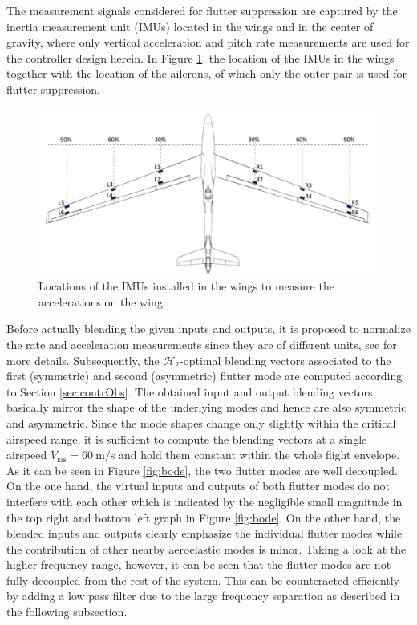 \documentclass[aerospace,article,submit,moreauthors,pdftex,10pt,a4paper]{Definitions/mdpi}
\begin{document}
The measurement signals considered for flutter suppression are captured by the inertia measurement unit (\acp{IMU}) located in the wings and in the center of gravity, where only vertical acceleration and pitch rate measurements are used for the controller design herein.
In Figure \ref{fig:sens}, the location of the \acp{IMU} in the wings together with the location of the ailerons, of which only the outer pair is used for flutter suppression.
%
\begin{figure}[!h]	
	\centering
	\includegraphics[width=0.75\linewidth]{figs/SensorPos}
	\caption{Locations of the \acp{IMU} installed in the wings to measure the accelerations on the wing.}
	\label{fig:sens}
\end{figure}
%
Before actually blending the given inputs and outputs, it is proposed to normalize the rate and acceleration measurements since they are of different units, see \cite{Pusch2018} for more details. Subsequently, the $\mathcal{H}_{2}$-optimal blending vectors associated to the first (symmetric) and second (asymmetric) flutter mode are computed according to Section \ref{sec:contrObs}. The obtained input and output blending vectors basically mirror the shape of the underlying modes and hence are also symmetric and asymmetric. Since the mode shapes change only slightly within the critical airspeed range, it is sufficient to compute the blending vectors at a single airspeed $V_\text{ias}=\SI{60}{\meter\per\second}$ and hold them constant within the whole flight envelope.
% 
As it can be seen in Figure \ref{fig:bode}, the two flutter modes are well decoupled. On the one hand, the virtual inputs and outputs of both flutter modes do not interfere with each other which is indicated by the negligible small magnitude in the top right and bottom left graph in Figure \ref{fig:bode}. On the other hand, the blended inputs and outputs clearly emphasize the individual flutter modes while the contribution of other nearby aeroelastic modes is minor. Taking a look at the higher frequency range, however, it can be seen that the flutter modes are not fully decoupled from the rest of the system. This can be counteracted efficiently by adding a low pass filter due to the large frequency separation as described in the following subsection.
\end{document}
